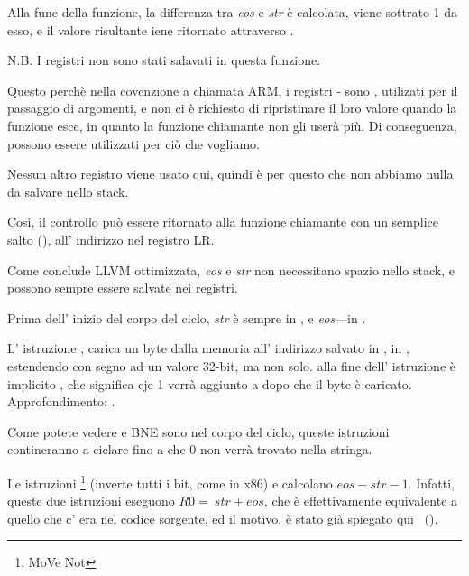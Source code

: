 Alla fune della funzione, la differenza tra 
\emph{eos} e \emph{str} è calcolata, viene sottrato 1 da esso, e il valore risultante iene ritornato
attraverso .

N.B. I registri non sono stati salavati in questa funzione.

Questo perchè nella covenzione a chiamata ARM, i registri - sono , 
utilizati per il passaggio di argomenti,
e non ci è richiesto di ripristinare il loro valore quando la funzione esce, 
in quanto la funzione chiamante non gli userà più.
Di conseguenza, possono essere utilizzati per ciò che vogliamo.

Nessun altro registro viene usato qui, quindi è per questo che non abbiamo nulla da salvare nello stack.

Così, il controllo può essere ritornato alla funzione chiamante con un semplice salto (),
all' indirizzo nel registro \ac{LR}.

\mysubparagraph{\OptimizingXcodeIV (\ThumbMode)}



Come conclude LLVM ottimizzata, \emph{eos} e \emph{str} non necessitano spazio nello stack, e possono sempre essere salvate nei registri.

Prima dell' inizio del corpo del ciclo, \emph{str} è sempre in , 
e \emph{eos}---in .

L' istruzione , carica un byte dalla memoria all' indirizzo salvato in , in , estendendo con segno ad un valore 32-bit, ma non solo.
 alla fine dell' istruzione è implicito , che significa cje 1 verrà aggiunto a  dopo che il byte è caricato.
Approfondimento: .

Come potete vedere \CMP e \ac{BNE} sono nel corpo del ciclo, queste istruzioni contineranno a ciclare fino a che 0 non verrà trovato nella stringa.

Le istruzioni \footnote{MoVe Not} (inverte tutti i bit, come \NOT in x86) e \ADD calcolano $eos - str - 1$.
Infatti, queste due istruzioni eseguono $R0 = ~str + eos$, 
che è effettivamente equivalente a quello che c' era nel codice sorgente, ed il motivo, è stato già spiegato qui
~().

